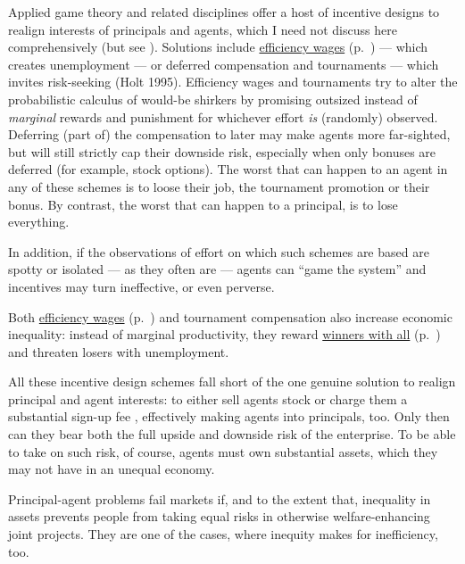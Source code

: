 Applied game theory and related disciplines offer a host of incentive designs to realign interests of principals and agents, which I need not discuss here comprehensively (but see \citealt{Tirole2006}).
Solutions include \hyperref[sec:efficiency-wages]{efficiency wages} (p.~\pageref{sec:efficiency-wages}) --- which creates unemployment --- or deferred compensation and tournaments --- which invites risk-seeking (Holt 1995).
Efficiency wages and tournaments try to alter the probabilistic calculus of would-be shirkers by promising outsized instead of \emph{marginal} rewards and punishment for whichever effort \emph{is} (randomly) observed.
Deferring (part of) the compensation to later may make agents more far-sighted, but will still strictly cap their downside risk, especially when only bonuses are deferred (for example, stock options).
The worst that can happen to an agent in any of these schemes is to loose their job, the tournament promotion or their bonus.
By contrast, the worst that can happen to a principal, is to lose everything.

In addition, if the observations of effort on which such schemes are based are spotty or isolated --- as they often are --- agents can ``game the system'' and incentives may turn ineffective, or even perverse.

Both \hyperref[sec:efficiency-wages]{efficiency wages} (p.~\pageref{sec:efficiency-wages}) and tournament compensation also increase economic inequality:
instead of marginal productivity, they reward \hyperref[sec:winner-take-all]{winners with all}  (p.~\pageref{sec:winner-take-all}) and threaten losers with unemployment.

All these incentive design schemes fall short of the one genuine solution to realign principal and agent interests:
to either sell agents stock or charge them a substantial sign-up fee \citep{Tirole2006}, effectively making agents into principals, too.
Only then can they bear both the full upside and downside risk of the enterprise.
To be able to take on such risk, of course, agents must own substantial assets, which they may not have in an unequal economy.

Principal-agent problems fail markets if, and to the extent that, inequality in assets prevents people from taking equal risks in otherwise welfare-enhancing joint projects.
They are one of the cases, where inequity makes for inefficiency, too.


